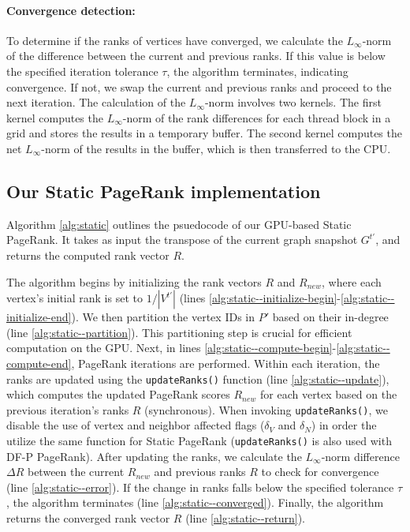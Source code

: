 \paragraph{Convergence detection:}

To determine if the ranks of vertices have converged, we calculate the $L_\infty$-norm of the difference between the current and previous ranks. If this value is below the specified iteration tolerance $\tau$, the algorithm terminates, indicating convergence. If not, we swap the current and previous ranks and proceed to the next iteration. The calculation of the $L_\infty$-norm involves two kernels. The first kernel computes the $L_\infty$-norm of the rank differences for each thread block in a grid and stores the results in a temporary buffer. The second kernel computes the net $L_\infty$-norm of the results in the buffer, which is then transferred to the CPU.




\subsection{Our Static PageRank implementation}
\label{sec:static-impl}

Algorithm \ref{alg:static} outlines the psuedocode of our GPU-based Static PageRank. It takes as input the transpose of the current graph snapshot $G^{t'}$, and returns the computed rank vector $R$.

The algorithm begins by initializing the rank vectors $R$ and $R_{new}$, where each vertex's initial rank is set to $1/|V^{t'}|$ (lines \ref{alg:static--initialize-begin}-\ref{alg:static--initialize-end}). We then partition the vertex IDs in $P'$ based on their in-degree (line \ref{alg:static--partition}). This partitioning step is crucial for efficient computation on the GPU. Next, in lines \ref{alg:static--compute-begin}-\ref{alg:static--compute-end}, PageRank iterations are performed. Within each iteration, the ranks are updated using the \texttt{updateRanks()} function (line \ref{alg:static--update}), which computes the updated PageRank scores $R_{new}$ for each vertex based on the previous iteration's ranks $R$ (synchronous). When invoking \texttt{updateRanks()}, we disable the use of vertex and neighbor affected flags ($\delta_V$ and $\delta_N$) in order the utilize the same function for Static PageRank (\texttt{updateRanks()} is also used with DF-P PageRank). After updating the ranks, we calculate the $L_\infty$-norm difference $\Delta R$ between the current $R_{new}$ and previous ranks $R$ to check for convergence (line \ref{alg:static--error}). If the change in ranks falls below the specified tolerance $\tau$, the algorithm terminates (line \ref{alg:static--converged}). Finally, the algorithm returns the converged rank vector $R$ (line \ref{alg:static--return}).

